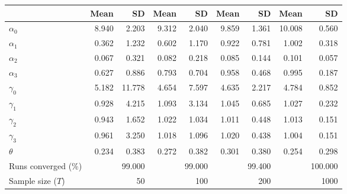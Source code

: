 
\begin{tabular}[t]{lrrrrrrrr}
\toprule
  & Mean & SD & Mean  & SD  & Mean   & SD   & Mean    & SD   \\
\midrule
$\alpha_{0}$ & 8.940 & 2.203 & 9.312 & 2.040 & 9.859 & 1.361 & 10.008 & 0.560\\
$\alpha_{1}$ & 0.362 & 1.232 & 0.602 & 1.170 & 0.922 & 0.781 & 1.002 & 0.318\\
$\alpha_{2}$ & 0.067 & 0.321 & 0.082 & 0.218 & 0.085 & 0.144 & 0.101 & 0.057\\
$\alpha_{3}$ & 0.627 & 0.886 & 0.793 & 0.704 & 0.958 & 0.468 & 0.995 & 0.187\\
$\gamma_{0}$ & 5.182 & 11.778 & 4.654 & 7.597 & 4.635 & 2.217 & 4.784 & 0.852\\
$\gamma_{1}$ & 0.928 & 4.215 & 1.093 & 3.134 & 1.045 & 0.685 & 1.027 & 0.232\\
$\gamma_{2}$ & 0.943 & 1.652 & 1.022 & 1.034 & 1.011 & 0.448 & 1.013 & 0.151\\
$\gamma_{3}$ & 0.961 & 3.250 & 1.018 & 1.096 & 1.020 & 0.438 & 1.004 & 0.151\\
$\theta$ & 0.234 & 0.383 & 0.272 & 0.382 & 0.301 & 0.380 & 0.254 & 0.298\\
Runs converged (\%) &  & 99.000 &  & 99.000 &  & 99.400 &  & 100.000\\
Sample size ($T$) &  & 50 &  & 100 &  & 200 &  & 1000\\
\bottomrule
\end{tabular}
